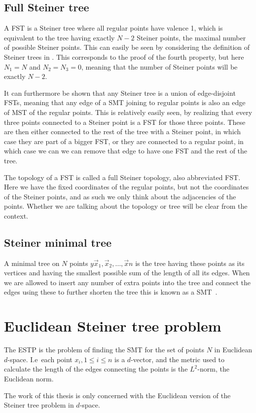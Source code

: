 \subsection{Full Steiner tree}
\label{sec:full-steiner-tree}

A \ac{FST} is a Steiner tree where all regular points have valence 1, which is
equivalent to the tree having exactly $N-2$ Steiner points, the maximal number
of possible Steiner points. This can easily be seen by considering the
definition of Steiner trees in . This corresponds to the
proof of the fourth property, but here $N_1 = N$ and $N_2 = N_3 = 0$, meaning
that the number of Steiner points will be exactly $N-2$.

It can furthermore be shown that any Steiner tree is a union of edge-disjoint
\acp{FST}, meaning that any edge of a \ac{SMT} joining to regular points is also
an edge of \ac{MST} of the regular points. This is relatively easily seen, by
realizing that every three points connected to a Steiner point is a \ac{FST} for
those three points. These are then either connected to the rest of the tree with
a Steiner point, in which case they are part of a bigger \ac{FST}, or they are
connected to a regular point, in which case we can we can remove that edge to
have one \ac{FST} and the rest of the tree.

The topology of a \ac{FST} is called a full Steiner topology, also abbreviated
\ac{FST}. Here we have the fixed coordinates of the regular points, but not the
coordinates of the Steiner points, and as such we only think about the
adjacencies of the points. Whether we are talking about the topology or tree
will be clear from the context.

\subsection{Steiner minimal tree}
\label{sec:steiner-minimal-tree}

A minimal tree on $N$ points $y\vec{x}_{1},\vec{x}_{2},\ldots,\vec{x}{n}$ is the
tree having these points as its vertices and having the smallest possible sum of
the length of all its edges. When we are allowed to insert any number of extra
points into the tree and connect the edges using these to further shorten the
tree this is known as a \ac{SMT}~\cite{Gilbert1968}.


\section{Euclidean Steiner tree problem}
\label{sec:eucl-stein-tree}

The \ac{ESTP} is the problem of finding the \ac{SMT} for the set of points $N$
in Euclidean $d$-space. I.e\ each point $x_{i}, 1 \le i \le n$ is a $d$-vector,
and the metric used to calculate the length of the edges connecting the points
is the $L^2$-norm, the Euclidean norm.

The work of this thesis is only concerned with the Euclidean version of the
Steiner tree problem in $d$-space.

